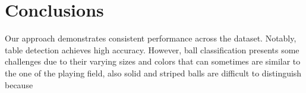 \section{Conclusions}
Our approach demonstrates consistent performance across the dataset. Notably, table detection achieves high accuracy. However, ball classification presents some challenges due to their varying sizes and colors that can sometimes are similar to the one of the playing field, also solid and striped balls are difficult to distinguish because %
